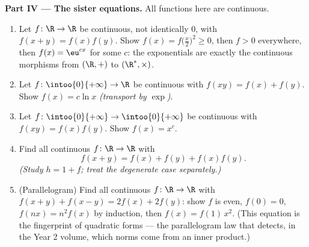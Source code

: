 \begin{problem}[{Weekend problem --- $f(x + y) = f(x) + f(y)$:
regularity forces linearity, and the portrait of the monsters}]
\medskip
\noindent\textbf{Part IV --- The sister equations.} All
functions here are continuous.
\begin{enumerate}[resume]
  \item Let $f \colon \R \to \R$ be continuous, not identically
        $0$, with $f(x + y) = f(x)f(y)$. Show $f(x) =
        f\bigl(\frac x2\bigr)^2 \geq 0$, then $f > 0$ everywhere,
        then $f(x) = \eu^{cx}$ for some $c$: the exponentials
        are exactly the continuous morphisms from $(\R, +)$ to
        $(\R^*, \times)$.
  \item Let $f \colon \intoo{0}{+\infty} \to \R$ be continuous
        with $f(xy) = f(x) + f(y)$. Show $f(x) = c\ln x$
        \emph{(transport by $\exp$)}.
  \item Let $f \colon \intoo{0}{+\infty} \to \intoo{0}{+\infty}$
        be continuous with $f(xy) = f(x)f(y)$. Show $f(x) = x^c$.
  \item Find all continuous $f \colon \R \to \R$ with
        \[
        f(x + y) = f(x) + f(y) + f(x)f(y) .
        \]
        \emph{(Study $h = 1 + f$; treat the degenerate case
        separately.)}
  \item (Parallelogram) Find all continuous $f \colon \R \to \R$
        with $f(x + y) + f(x - y) = 2f(x) + 2f(y)$: show $f$ is
        even, $f(0) = 0$, $f(nx) = n^2 f(x)$ by induction, then
        $f(x) = f(1)\,x^2$. (This equation is the fingerprint of
        quadratic forms --- the parallelogram law that detects,
        in the Year 2 volume, which norms come from an inner
        product.)
\end{enumerate}


\end{problem}

